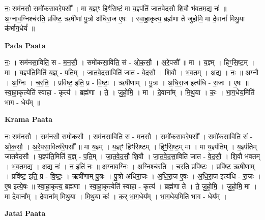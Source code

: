 \documentclass[17pt]{extarticle}
\begin{document}
नः॒ सम॑नसौ॒ समो॑कसावरे॒पसौ᳚ । मा य॒ज्ञ्ꣳ हिꣳ॑सिष्टं॒ मा य॒ज्ञ्प॑तिं जातवेदसौ शि॒वौ भ॑वतम॒द्य नः॑ ॥ अ॒ग्नाव॒ग्निश्च॑रति॒ प्रवि॑ष्ट॒ ऋषी॑णां पु॒त्रो अ॑धिरा॒ज ए॒षः । स्वा॒हा॒कृत्य॒ ब्रह्म॑णा ते जुहोमि॒ मा दे॒वानां᳚ मिथु॒या क॑र्भाग॒धेयं᳚ ॥ \newline

\textbf{Pada Paata} \newline

नः॒ । सम॑नसा॒विति॒ स - म॒न॒सौ॒ । समो॑कसा॒विति॒ सं - ओ॒क॒सौ॒ । अ॒रे॒पसौ᳚ ॥ मा । य॒ज्ञ्म् । हिꣳ॒॒सि॒ष्ट॒म् । मा । य॒ज्ञ्प॑ति॒मिति॑ य॒ज्ञ् - प॒ति॒म् । जा॒त॒वे॒द॒सा॒विति॑ जात - वे॒द॒सौ॒ । शि॒वौ । भ॒व॒त॒म् । अ॒द्य । नः॒ ॥ अ॒ग्नौ । अ॒ग्निः । च॒र॒ति॒ । प्रवि॑ष्ट॒ इति॒ प्र - वि॒ष्टः॒ । ऋषी॑णाम् । पु॒त्रः । अ॒धि॒रा॒ज इत्य॑धि - रा॒जः । ए॒षः ॥ स्वा॒हा॒कृत्येति॑ स्वाहा - कृत्य॑ । ब्रह्म॑णा । ते॒ । जु॒हो॒मि॒ । मा । दे॒वाना᳚म् । मि॒थु॒या । कः॒ । भा॒ग॒धेय॒मिति॑ भाग - धेय᳚म् ॥  \newline


\textbf{Krama Paata} \newline

नः॒ सम॑नसौ । सम॑नसौ॒ समो॑कसौ । सम॑नसा॒विति॒ स - म॒न॒सौ॒ । समो॑कसावरे॒पसौ᳚ । समो॑कसा॒विति॒ सं - ओ॒क॒सौ॒ । अ॒रे॒पसा॒वित्य॑रे॒पसौ᳚ ॥ मा य॒ज्ञ्म् । य॒ज्ञ्ꣳ हिꣳ॑सिष्टम् । हिꣳ॒॒सि॒ष्ट॒म् मा । मा य॒ज्ञ्प॑तिम् । य॒ज्ञ्प॑तिम् जातवेदसौ । य॒ज्ञ्प॑ति॒मिति॑ य॒ज्ञ् - प॒ति॒म् । जा॒त॒वे॒द॒सौ॒ शि॒वौ । जा॒त॒वे॒द॒सा॒विति॑ जात - वे॒द॒सौ॒ । शि॒वौ भ॑वतम् । भ॒व॒त॒म॒द्य । अ॒द्य नः॑ । न॒ इति॑ नः ॥ अ॒ग्नाव॒ग्निः । अ॒ग्निश्च॑रति । च॒र॒ति॒ प्रवि॑ष्टः । प्रवि॑ष्ट॒ ऋषी॑णाम् । प्रवि॑ष्ट॒ इति॒ प्र - वि॒ष्टः॒ । ऋषी॑णाम् पु॒त्रः । पु॒त्रो अ॑धिरा॒जः । अ॒धि॒रा॒ज ए॒षः । अ॒धि॒रा॒ज इत्य॑धि - रा॒जः । ए॒ष इत्ये॒षः ॥ स्वा॒हा॒कृत्य॒ ब्रह्म॑णा । स्वा॒हा॒कृत्येति॑ स्वाहा - कृत्य॑ । ब्रह्म॑णा ते । ते॒ जु॒हो॒मि॒ । जु॒हो॒मि॒ मा । मा दे॒वाना᳚म् । दे॒वाना᳚म् मिथु॒या । मि॒थु॒या कः॑ । क॒र् भा॒ग॒धेय᳚म् । भा॒ग॒धेय॒मिति॑ भाग - धेय᳚म् । \newline

\textbf{Jatai Paata} \newline
\end{document}
